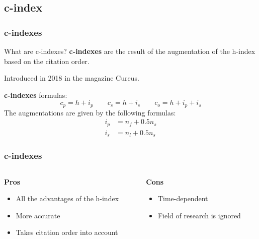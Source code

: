 \documentclass{beamer}
\newcommand{\pros}{\item[{\textcolor[HTML]{3C8031}{\ding{51}}}]}
\newcommand{\cons}{\item[\textcolor{red}{\ding{54}}]}
\begin{document}
\subsection{c-index}
\begin{frame}
    \frametitle{c-indexes}
    \begin{block}{What are c-indexes?}
        \textbf{c-indexes}\cite{post2018c} are the result of the augmentation of
        the h-index based on the citation order.
    \end{block}
    \begin{alertblock}{}
        Introduced in 2018 in the magazine Cureus.
    \end{alertblock}
    \textbf{c-indexes} formulas:
    \[
        c_p = h + i_p  \qquad
        c_s = h + i_s  \qquad
        c_o = h + i_p + i_s
    \]
    The augmentations are given by the following formulas:
    \begin{align*}
        i_p & = n_f + 0.5 n_s \\
        i_s & = n_l + 0.5 n_s
    \end{align*}
\end{frame}

\begin{frame}
    \frametitle{c-indexes}
    \begin{columns}[T]
        \begin{column}{.5\textwidth}
            \centering \textbf{Pros}
            \begin{itemize}[<+->]
                \pros All the advantages of the h-index
                \pros More accurate
                \pros Takes citation order into account
            \end{itemize}
        \end{column}
        \begin{column}{.5\textwidth}
            \centering \textbf{Cons}
            \begin{itemize}[<+->]
                \cons Time-dependent
                \cons Field of research is ignored
            \end{itemize}
        \end{column}
    \end{columns}
\end{frame}
\end{document}
